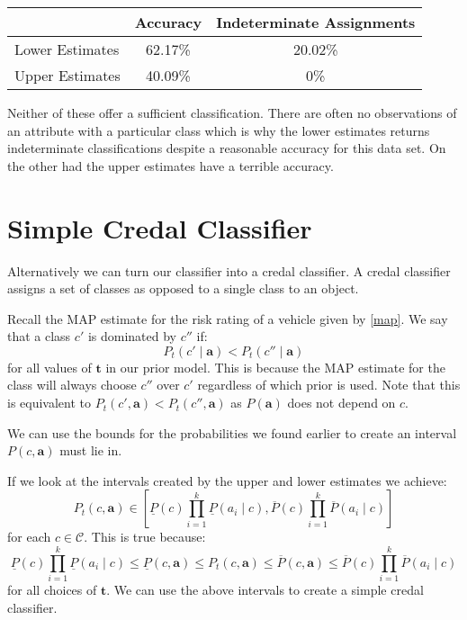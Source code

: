 \begin{center}
	\begin{tabular}{l|c c}
	                & Accuracy & Indeterminate Assignments \\
	\hline
	Lower Estimates & 62.17\%  & 20.02\%            \\
	Upper Estimates & 40.09\%  & 0\%                \\
	\end{tabular}
\end{center}

Neither of these offer a sufficient classification.
There are often no observations of an attribute with a particular class which is why the lower estimates returns indeterminate classifications despite a reasonable accuracy for this data set.
On the other had the upper estimates have a terrible accuracy.

\section{Simple Credal Classifier}
Alternatively we can turn our classifier into a credal classifier.
A credal classifier assigns a set of classes as opposed to a single class to an object.

Recall the MAP estimate for the risk rating of a vehicle given by \cref{map}.
We say that a class $c'$ is dominated by $c''$ if:
\begin{equation}\label{Credal Dominance}
	P_t(c' \mid \mathbf{a}) < P_t(c'' \mid \mathbf{a})
\end{equation}
for all values of $\mathbf{t}$ in our prior model.
This is because the MAP estimate for the class will always choose $c''$ over $c'$ regardless of which prior is used.
Note that this is equivalent to $P_t(c', \mathbf{a}) < P_t(c'', \mathbf{a})$ as $P(\mathbf{a})$ does not depend on $c$.

We can use the bounds for the probabilities we found earlier to create an interval $P(c, \mathbf{a})$ must lie in. 

If we look at the intervals created by the upper and lower estimates we achieve:
\begin{equation}
	P_t(c, \mathbf{a}) \in \left[ \underline{P}(c)\prod_{i=1}^k \underline{P}(a_i \mid c), \overline{P}(c)\prod_{i=1}^k \overline{P}(a_i \mid c) \right]
\end{equation}
for each $c \in \mathcal{C}$.
This is true because:
\begin{equation}
\underline{P}(c)\prod_{i=1}^k \underline{P}(a_i \mid c) \leq \underline{P}(c, \mathbf{a}) \leq P_t(c, \mathbf{a}) \leq \overline{P}(c, \mathbf{a}) \leq \overline{P}(c)\prod_{i=1}^k \overline{P}(a_i \mid c)
\end{equation}
for all choices of $\mathbf{t}$.
We can use the above intervals to create a simple credal classifier.

